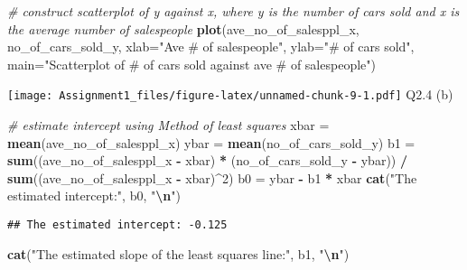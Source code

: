 \documentclass[
]{article}
\newenvironment{Shaded}{\begin{snugshade}}{\end{snugshade}}
\newcommand{\AttributeTok}[1]{\textcolor[rgb]{0.13,0.29,0.53}{#1}}
\newcommand{\CommentTok}[1]{\textcolor[rgb]{0.56,0.35,0.01}{\textit{#1}}}
\newcommand{\DecValTok}[1]{\textcolor[rgb]{0.00,0.00,0.81}{#1}}
\newcommand{\FunctionTok}[1]{\textcolor[rgb]{0.13,0.29,0.53}{\textbf{#1}}}
\newcommand{\NormalTok}[1]{#1}
\newcommand{\OtherTok}[1]{\textcolor[rgb]{0.56,0.35,0.01}{#1}}
\newcommand{\SpecialCharTok}[1]{\textcolor[rgb]{0.81,0.36,0.00}{\textbf{#1}}}
\newcommand{\StringTok}[1]{\textcolor[rgb]{0.31,0.60,0.02}{#1}}
\begin{document}
\begin{Shaded}
\begin{Highlighting}[]
\CommentTok{\# construct scatterplot of y against x, where y is the number of cars sold and x is the average number of salespeople}
\FunctionTok{plot}\NormalTok{(ave\_no\_of\_salesppl\_x, no\_of\_cars\_sold\_y, }\AttributeTok{xlab=}\StringTok{"Ave \# of salespeople"}\NormalTok{, }\AttributeTok{ylab=}\StringTok{"\# of cars sold"}\NormalTok{, }\AttributeTok{main=}\StringTok{"Scatterplot of \# of cars sold against ave \# of salespeople"}\NormalTok{)}
\end{Highlighting}
\end{Shaded}

\texttt{[image: Assignment1\_files/figure-latex/unnamed-chunk-9-1.pdf]}
Q2.4 (b)

\begin{Shaded}
\begin{Highlighting}[]
\CommentTok{\# estimate intercept using Method of least squares}
\NormalTok{xbar }\OtherTok{=} \FunctionTok{mean}\NormalTok{(ave\_no\_of\_salesppl\_x)}
\NormalTok{ybar }\OtherTok{=} \FunctionTok{mean}\NormalTok{(no\_of\_cars\_sold\_y)}
\NormalTok{b1 }\OtherTok{=} \FunctionTok{sum}\NormalTok{((ave\_no\_of\_salesppl\_x }\SpecialCharTok{{-}}\NormalTok{ xbar) }\SpecialCharTok{*}\NormalTok{ (no\_of\_cars\_sold\_y }\SpecialCharTok{{-}}\NormalTok{ ybar)) }\SpecialCharTok{/} \FunctionTok{sum}\NormalTok{((ave\_no\_of\_salesppl\_x }\SpecialCharTok{{-}}\NormalTok{ xbar)}\SpecialCharTok{\^{}}\DecValTok{2}\NormalTok{)}
\NormalTok{b0 }\OtherTok{=}\NormalTok{ ybar }\SpecialCharTok{{-}}\NormalTok{ b1 }\SpecialCharTok{*}\NormalTok{ xbar}
\FunctionTok{cat}\NormalTok{(}\StringTok{"The estimated intercept:"}\NormalTok{, b0, }\StringTok{"}\SpecialCharTok{\textbackslash{}n}\StringTok{"}\NormalTok{)}
\end{Highlighting}
\end{Shaded}

\begin{verbatim}
## The estimated intercept: -0.125
\end{verbatim}

\begin{Shaded}
\begin{Highlighting}[]
\FunctionTok{cat}\NormalTok{(}\StringTok{"The estimated slope of the least squares line:"}\NormalTok{, b1, }\StringTok{"}\SpecialCharTok{\textbackslash{}n}\StringTok{"}\NormalTok{)}
\end{Highlighting}
\end{Shaded}
\end{document}
